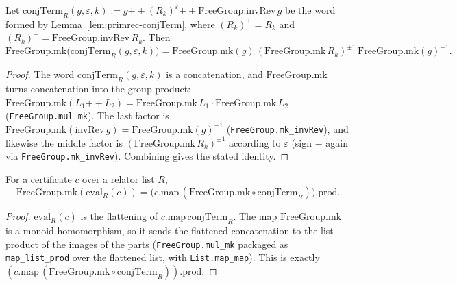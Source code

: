 \begin{lemma}
    \label{lem:mk-conjTerm}
    \leanok
    Let $\mathrm{conjTerm}_R(g, \varepsilon, k) := g \mathbin{+\!\!+}
    (R_k)^{\varepsilon} \mathbin{+\!\!+} \mathrm{FreeGroup.invRev}\,g$ be the word
    formed by Lemma~\ref{lem:primrec-conjTerm}, where $(R_k)^{+} = R_k$ and
    $(R_k)^{-} = \mathrm{FreeGroup.invRev}\,R_k$. Then
    \[
        \mathrm{FreeGroup.mk}\bigl(\mathrm{conjTerm}_R(g,\varepsilon,k)\bigr)
        = \mathrm{FreeGroup.mk}(g)\,
            (\mathrm{FreeGroup.mk}\,R_k)^{\pm 1}\,
            \mathrm{FreeGroup.mk}(g)^{-1}.
    \]
\end{lemma}
\begin{proof}
    The word $\mathrm{conjTerm}_R(g,\varepsilon,k)$ is a concatenation, and
    $\mathrm{FreeGroup.mk}$ turns concatenation into the group product:
    $\mathrm{FreeGroup.mk}(L_1 \mathbin{+\!\!+} L_2) =
    \mathrm{FreeGroup.mk}\,L_1 \cdot \mathrm{FreeGroup.mk}\,L_2$
    (\texttt{FreeGroup.mul\_mk}). The last factor is
    $\mathrm{FreeGroup.mk}(\mathrm{invRev}\,g) = \mathrm{FreeGroup.mk}(g)^{-1}$
    (\texttt{FreeGroup.mk\_invRev}), and likewise the middle factor is
    $(\mathrm{FreeGroup.mk}\,R_k)^{\pm 1}$ according to $\varepsilon$ (sign $-$
    again via \texttt{FreeGroup.mk\_invRev}). Combining gives the stated identity.
\end{proof}

\begin{lemma}
    \label{lem:mk-eval-eq-map-prod}
    \leanok
    For a certificate $c$ over a relator list $R$,
    \[
        \mathrm{FreeGroup.mk}(\mathrm{eval}_R(c)) =
        \bigl(c.\mathrm{map}\,(\mathrm{FreeGroup.mk} \circ \mathrm{conjTerm}_R)\bigr).\mathrm{prod}.
    \]
\end{lemma}
\begin{proof}
    $\mathrm{eval}_R(c)$ is the flattening of $c.\mathrm{map}\,\mathrm{conjTerm}_R$.
    The map $\mathrm{FreeGroup.mk}$ is a monoid homomorphism, so it sends the
    flattened concatenation to the list product of the images of the parts
    (\texttt{FreeGroup.mul\_mk} packaged as \texttt{map\_list\_prod} over the
    flattened list, with \texttt{List.map\_map}). This is exactly
    $(c.\mathrm{map}\,(\mathrm{FreeGroup.mk} \circ \mathrm{conjTerm}_R)).\mathrm{prod}$.
\end{proof}

